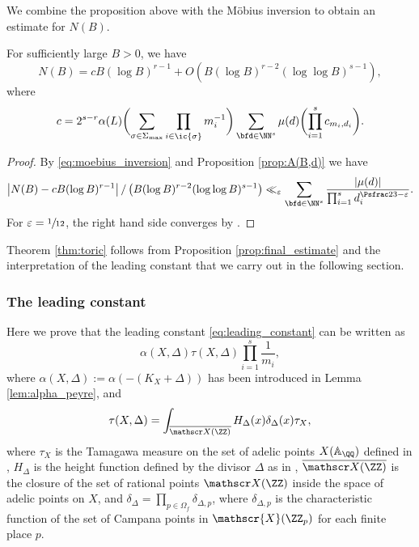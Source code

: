 We combine the proposition above with the Möbius inversion to obtain an estimate for $N(B)$.

\begin{prop}
\label{prop:final_estimate}
For sufficiently large $B>0$, we have
\[
N(B) = c B(\log B)^{r-1} + O(
B(\log B)^{r-2}(\log\log B)^{s-1}),
\]
where
\begin{equation}
\label{eq:leading_constant}
c=2^{s-r}\alpha(L)\biggl(\sum_{\sigma\in\Sigma_{\max}}\prod_{i\in\ic{\sigma}}m_i^{-1}\biggr)
\sum_{\bfd\in\NN^{s}}\mu(d)
\biggl(\prod_{i=1}^sc_{m_i,d_i}\biggr).
\end{equation}
\end{prop}
\begin{proof}
By \eqref{eq:moebius_inversion} and Proposition \ref{prop:A(B,d)}
we have
\[
\left|
N(B)-
c B(\log B)^{r-1}
\right|
/ \left(B(\log B)^{r-2}(\log\log B)^{s-1} \right) \ll_{\varepsilon}
\sum_{\bfd\in\NN^{s}}\frac{|\mu(d)|}
{\prod_{i=1}^s d_i^{\Psfrac23-\varepsilon}}.
\]
For $\varepsilon=\sfrac1{12}$, the right hand side converges by \cite[Lem.\,11.15]{MR1679841}.
\end{proof}

Theorem \ref{thm:toric} follows from Proposition \ref{prop:final_estimate}
and the interpretation of the leading constant that we carry out in the following section.

\subsubsection{The leading constant}

Here we prove that the leading constant \eqref{eq:leading_constant} can be written as\vspace*{-3pt}
\begin{equation}
\label{eq:expected_leading_constant}
\alpha(X, \Delta)\tau(X,\Delta)\prod_{i=1}^s\frac 1{m_i},
\end{equation}
where $\alpha(X,\Delta):=\alpha(-(K_X+\Delta))$ has been introduced in
Lemma \ref{lem:alpha_peyre}, and\vspace*{-3pt}
\[
\tau(X,\Delta)=\int_{\overline {\mathscr X(\ZZ)}}H_{\Delta}(x) \delta_{\Delta}(x) \tau_X,
\]
where $\tau_X$ is the Tamagawa measure on the set of adelic points $X(\mathbb A_\QQ)$
defined in \cite[Def.\,2.8]{MR2740045},
$H_\Delta$ is the height function defined by the divisor $\Delta$ as in \cite[\S2.1]{MR1369408},
$\overline {\mathscr X(\ZZ)}$ is the closure of the set of rational points $\mathscr X(\ZZ)$
inside the space of adelic points on $X$,
and $\delta_{\Delta}=\prod_{p\in\Omega_f}\delta_{\Delta, p}$,
where $\delta_{\Delta,p}$ is the characteristic function of the set of
Campana points in $\mathscr{X}(\ZZ_p)$ for each finite place $p$.

